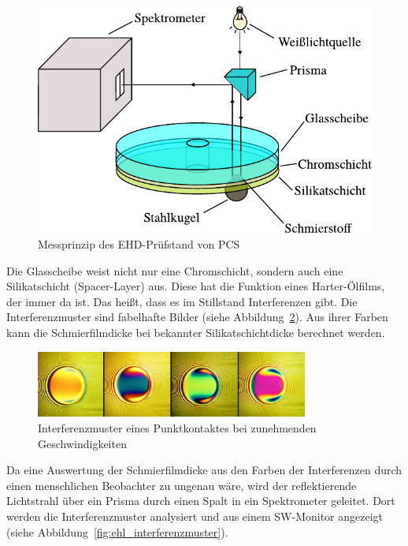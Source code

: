 \begin{figure}[htb]
    \centering
    \includegraphics[]{./images/ehd_messprinzip.pdf}
    \caption{Messprinzip des EHD-Prüfstand von PCS~\cite{mach_2008}}
    \label{fig:ehl_messprinzip}
\end{figure}

Die Glasscheibe weist nicht nur eine Chromschicht, sondern auch eine Silikatschicht (Spacer-Layer) aus.
Diese hat die Funktion eines Harter-Ölfilms, der immer da ist.
Das heißt, dass es im Stillstand Interferenzen gibt.
Die Interferenzmuster sind fabelhafte Bilder (siehe Abbildung~\ref{fig:ehl_bilder}).
Aus ihrer Farben kann die Schmierfilmdicke bei bekannter Silikatschichtdicke berechnet werden.

\begin{figure}[htb]
    \centering
    \includegraphics[width=0.8\textwidth]{./images/ehl_contact_at_increasing_speeds.png}
    \caption{Interferenzmuster eines Punktkontaktes bei zunehmenden Geschwindigkeiten~\cite{ehl_broshure}}
    \label{fig:ehl_bilder}
\end{figure}

Da eine Auswertung der Schmierfilmdicke aus den Farben der Interferenzen durch einen menschlichen Beobachter zu ungenau wäre, wird der reflektierende Lichtstrahl über ein Prisma durch einen Spalt in ein Spektrometer geleitet.
Dort werden die Interferenzmuster analysiert und aus einem SW-Monitor angezeigt (siehe Abbildung~\ref{fig:ehl_interferenzmuster}).

